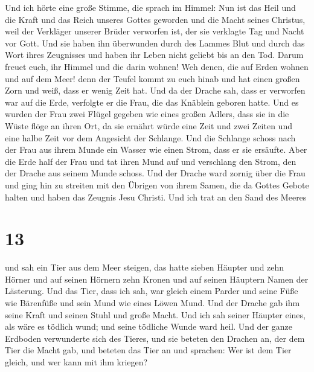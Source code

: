  Und ich hörte eine große Stimme, die sprach im Himmel:
Nun ist das Heil und die Kraft und das Reich unseres Gottes geworden und
die Macht seines Christus, weil der Verkläger unserer Brüder verworfen
ist, der sie verklagte Tag und Nacht vor Gott.  Und sie
haben ihn überwunden durch des Lammes Blut und durch das Wort ihres
Zeugnisses und haben ihr Leben nicht geliebt bis an den Tod.
 Darum freuet euch, ihr Himmel und die darin wohnen! Weh
denen, die auf Erden wohnen und auf dem Meer! denn der Teufel kommt zu
euch hinab und hat einen großen Zorn und weiß, dass er wenig Zeit hat.
 Und da der Drache sah, dass er verworfen war auf die
Erde, verfolgte er die Frau, die das Knäblein geboren hatte.
 Und es wurden der Frau zwei Flügel gegeben wie eines
großen Adlers, dass sie in die Wüste flöge an ihren Ort, da sie ernährt
würde eine Zeit und zwei Zeiten und eine halbe Zeit vor dem Angesicht
der Schlange.  Und die Schlange schoss nach der Frau aus
ihrem Munde ein Wasser wie einen Strom, dass er sie ersäufte.
 Aber die Erde half der Frau und tat ihren Mund auf und
verschlang den Strom, den der Drache aus seinem Munde schoss.
 Und der Drache ward zornig über die Frau und ging hin zu
streiten mit den Übrigen von ihrem Samen, die da Gottes Gebote halten
und haben das Zeugnis Jesu Christi.  Und ich trat an den
Sand des Meeres

\hypertarget{section-12}{%
\section{13}\label{section-12}}

 und sah ein Tier aus dem Meer steigen, das hatte sieben
Häupter und zehn Hörner und auf seinen Hörnern zehn Kronen und auf
seinen Häuptern Namen der Lästerung.  Und das Tier, dass
ich sah, war gleich einem Parder und seine Füße wie Bärenfüße und sein
Mund wie eines Löwen Mund. Und der Drache gab ihm seine Kraft und seinen
Stuhl und große Macht.  Und ich sah seiner Häupter eines,
als wäre es tödlich wund; und seine tödliche Wunde ward heil. Und der
ganze Erdboden verwunderte sich des Tieres,  und sie
beteten den Drachen an, der dem Tier die Macht gab, und beteten das Tier
an und sprachen: Wer ist dem Tier gleich, und wer kann mit ihm kriegen?

